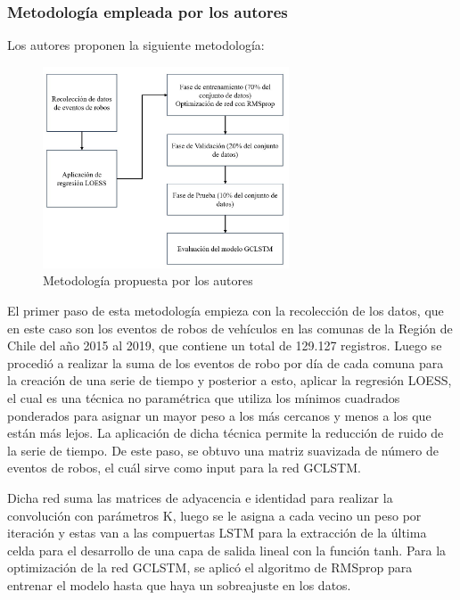 \subsubsection{Metodología empleada por los autores}
Los autores proponen la siguiente metodología: %


\begin{figure}[h]
	\begin{center}
		\includegraphics[width=0.65\textwidth]{2/figures/ChileMetodo.jpg}
		\caption{Metodología propuesta por los autores}
		\label{1:fig2}
	\end{center}
\end{figure}

El primer paso de esta metodología empieza con la recolección de los datos, que en este caso son los eventos de robos de vehículos en las comunas de la Región de Chile del año 2015 al 2019, que contiene un total de 129.127 registros. Luego se procedió a realizar la suma de los eventos de robo por día de cada comuna para la creación de una serie de tiempo y posterior a esto, aplicar la regresión LOESS, el cual es una técnica no paramétrica que utiliza los mínimos cuadrados ponderados para asignar un mayor peso a los más cercanos y menos a los que están más lejos. La aplicación de dicha técnica permite la reducción de ruido de la serie de tiempo. De este paso, se obtuvo una matriz suavizada de número de eventos de robos, el cuál sirve como input para la red GCLSTM. 

Dicha red suma las matrices de adyacencia e identidad para realizar la convolución con parámetros K, luego se le asigna a cada vecino un peso por iteración y estas van a las compuertas LSTM para la extracción de la última celda para el desarrollo de una capa de salida lineal con la función tanh. Para la optimización de la red GCLSTM, se aplicó el algoritmo de RMSprop para entrenar el modelo hasta que haya un sobreajuste en los datos.

